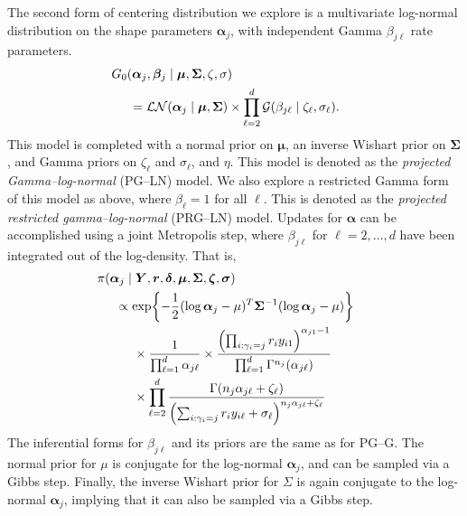 The second form of centering distribution we explore is a multivariate log-normal distribution on the shape parameters $\bm{\alpha}_j$, with independent Gamma $\beta_{j\ell}$ rate parameters.  
\begin{equation}
    \begin{aligned}
    &\hspace{-0.5cm}G_0\left(\bm{\alpha}_j,\bm{\beta}_j\mid\bm{\mu},\bm{\Sigma},\zeta,\sigma\right) \\
    &=\mathcal{LN}\left(\bm{\alpha}_j\mid\bm{\mu},\bm{\Sigma}\right)\times\prod_{\ell = 2}^d\mathcal{G}\left(\beta_{j\ell}\mid\zeta_{\ell},\sigma_{\ell}\right).
    \end{aligned}
\end{equation}
This model is completed with a normal prior on $\bm{\mu}$, an inverse Wishart prior on
$\bm{\Sigma}$, and Gamma priors on $\zeta_{\ell}$ and $\sigma_{\ell}$, and $\eta$.  
This model is denoted as the \emph{projected Gamma--log-normal} (PG--LN) model.  
We also explore a restricted Gamma form of this model as above, where 
$\beta_{\ell} = 1$ for all $\ell$.  This is denoted as the 
\emph{projected restricted gamma--log-normal} (PRG--LN) model.  Updates for 
$\bm{\alpha}$ can be accomplished using a joint Metropolis step, where 
$\beta_{j\ell}$ for $\ell = 2,\ldots,d$ have been integrated out of the 
log-density.  That is,
\begin{equation*}
    \begin{aligned}
    &\hspace{-0.5cm}\pi(\bm{\alpha}_j\mid\bm{Y},\bm{r},\bm{\delta},\bm{\mu},\bm{\Sigma},\bm{\zeta},\bm{\sigma})\\
    &\propto \exp\left\lbrace-\frac{1}{2}(\log\bm{\alpha}_j - \mu)^T\bm{\Sigma}^{-1}(\log\bm{\alpha}_j - \mu)\right\rbrace \\
    &\hspace{0.5cm}\times\frac{1}{\prod_{\ell = 1}^d\alpha_{j\ell}}\times \frac{\left(\prod_{i:\gamma_i = j}r_iy_{i1}\right)^{\alpha_{j1} - 1}}{\prod_{\ell = 1}^d\Gamma^{n_j}(\alpha_{j\ell})}\\
    &\hspace{0.5cm}\times \prod_{\ell = 2}^d\frac{\Gamma\left(n_j\alpha_{j\ell} + \zeta_{\ell}\right)}{\left(\sum_{i:\gamma_i = j}r_iy_{i\ell} + \sigma_{\ell}\right)^{n_j\alpha_{j\ell} + \zeta_{\ell}}}
    \end{aligned}
\end{equation*}
The inferential forms for $\beta_{j\ell}$ and its priors are the same as for PG--G.  The 
  normal prior for $\mu$ is conjugate for the log-normal $\bm{\alpha}_j$, and can be sampled
  via a Gibbs step.  Finally, the inverse Wishart prior for $\Sigma$ is again conjugate to
  the log-normal $\bm{\alpha}_j$, implying that it can also be sampled via a Gibbs step.

